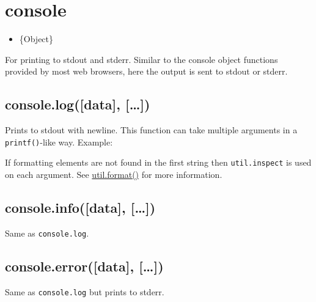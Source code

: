 \section{console}

\begin{Shaded}
\begin{Highlighting}[]
\NormalTok{: } 
\end{Highlighting}
\end{Shaded}

\begin{itemize}
\item
  \{Object\}
\end{itemize}

For printing to stdout and stderr. Similar to the console object
functions provided by most web browsers, here the output is sent to
stdout or stderr.

\subsection{console.log({[}data{]}, {[}\ldots{}{]})}

Prints to stdout with newline. This function can take multiple arguments
in a \texttt{printf()}-like way. Example:

\begin{Shaded}
\end{Shaded}

If formatting elements are not found in the first string then
\texttt{util.inspect} is used on each argument. See
\href{util.html\#util\_util\_format\_format}{util.format()} for more
information.

\subsection{console.info({[}data{]}, {[}\ldots{}{]})}

Same as \texttt{console.log}.

\subsection{console.error({[}data{]}, {[}\ldots{}{]})}

Same as \texttt{console.log} but prints to stderr.

